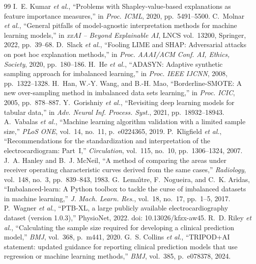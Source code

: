\begin{thebibliography}{99}
 I.~E. Kumar \emph{et al.}, ``Problems with Shapley-value-based explanations as feature importance measures,'' in \emph{Proc. ICML}, 2020, pp.~5491--5500.
 C.~Molnar \emph{et al.}, ``General pitfalls of model-agnostic interpretation methods for machine learning models,'' in \emph{xxAI -- Beyond Explainable AI}, LNCS vol.~13200, Springer, 2022, pp.~39--68.
 D.~Slack \emph{et al.}, ``Fooling LIME and SHAP: Adversarial attacks on post hoc explanation methods,'' in \emph{Proc. AAAI/ACM Conf. AI, Ethics, Society}, 2020, pp.~180--186.
 H.~He \emph{et al.}, ``ADASYN: Adaptive synthetic sampling approach for imbalanced learning,'' in \emph{Proc. IEEE IJCNN}, 2008, pp.~1322--1328.
 H.~Han, W.-Y. Wang, and B.-H. Mao, ``Borderline-SMOTE: A new over-sampling method in imbalanced data sets learning,'' in \emph{Proc. ICIC}, 2005, pp.~878--887.
 Y.~Gorishniy \emph{et al.}, ``Revisiting deep learning models for tabular data,'' in \emph{Adv. Neural Inf. Process. Syst.}, 2021, pp.~18932--18943.
 A.~Vabalas \emph{et al.}, ``Machine learning algorithm validation with a limited sample size,'' \emph{PLoS ONE}, vol.~14, no.~11, p.~e0224365, 2019.
 P.~Kligfield \emph{et al.}, ``Recommendations for the standardization and interpretation of the electrocardiogram: Part~I,'' \emph{Circulation}, vol.~115, no.~10, pp.~1306--1324, 2007.
 J.~A. Hanley and B.~J. McNeil, ``A method of comparing the areas under receiver operating characteristic curves derived from the same cases,'' \emph{Radiology}, vol.~148, no.~3, pp.~839--843, 1983.
 G.~Lema{\^\i}tre, F.~Nogueira, and C.~K. Aridas, ``Imbalanced-learn: A Python toolbox to tackle the curse of imbalanced datasets in machine learning,'' \emph{J. Mach. Learn. Res.}, vol.~18, no.~17, pp.~1--5, 2017.
 P.~Wagner \emph{et al.}, ``PTB-XL, a large publicly available electrocardiography dataset (version 1.0.3),'' PhysioNet, 2022. doi: 10.13026/kfzx-aw45.
 R.~D. Riley \emph{et al.}, ``Calculating the sample size required for developing a clinical prediction model,'' \emph{BMJ}, vol.~368, p.~m441, 2020.
 G.~S. Collins \emph{et al.}, ``TRIPOD+AI statement: updated guidance for reporting clinical prediction models that use regression or machine learning methods,'' \emph{BMJ}, vol.~385, p.~e078378, 2024.
\end{thebibliography}

